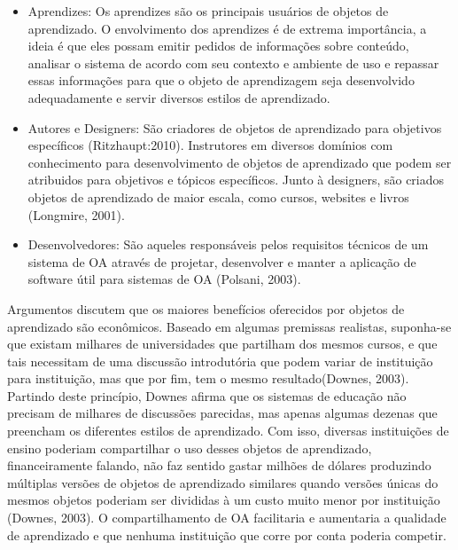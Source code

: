 \documentclass[12pt,openright,oneside,a4paper,english,french,spanish,brazil]{unifil}
\begin{document}
\begin{itemize}
\item Aprendizes: Os aprendizes são os principais usuários de objetos de aprendizado. O envolvimento dos aprendizes é de extrema importância, a ideia é que eles possam emitir pedidos de informações sobre conteúdo, analisar o sistema de acordo com seu contexto e ambiente de uso e repassar essas informações para que o objeto de aprendizagem seja desenvolvido adequadamente e servir diversos estilos de aprendizado.
\item Autores e Designers: São criadores de objetos de aprendizado para objetivos específicos (Ritzhaupt:2010). Instrutores em diversos domínios com conhecimento para desenvolvimento de objetos de aprendizado que podem ser atribuidos para objetivos e tópicos específicos. Junto à designers, são criados objetos de aprendizado de maior escala, como cursos, websites e livros (Longmire, 2001).
\item Desenvolvedores: São aqueles responsáveis pelos requisitos técnicos de um sistema de OA através de projetar, desenvolver e manter a aplicação de software útil para sistemas de OA (Polsani, 2003).
\end{itemize}

Argumentos discutem que os maiores benefícios oferecidos por objetos de aprendizado são econômicos. Baseado em algumas premissas realistas, suponha-se que existam milhares de universidades que partilham dos mesmos cursos, e que tais necessitam de uma discussão introdutória que podem variar de instituição para instituição, mas que por fim, tem o mesmo resultado(Downes, 2003). Partindo deste princípio, Downes afirma que os sistemas de educação não precisam de milhares de discussões parecidas, mas apenas algumas dezenas que preencham os diferentes estilos de aprendizado. Com isso, diversas instituições de ensino poderiam compartilhar o uso desses objetos de aprendizado, financeiramente falando, não faz sentido gastar milhões de dólares produzindo múltiplas versões de objetos de aprendizado similares quando versões únicas do mesmos objetos poderiam ser divididas à um custo muito menor por instituição (Downes, 2003). O compartilhamento de OA facilitaria e aumentaria a qualidade de aprendizado e que nenhuma instituição que corre por conta poderia competir.
\end{document}
